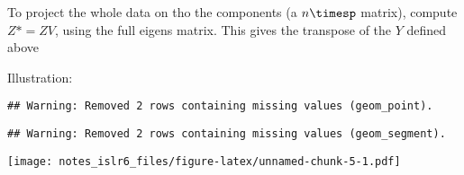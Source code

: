 \documentclass[
]{article}
\newenvironment{Shaded}{\begin{snugshade}}{\end{snugshade}}
\newcommand{\DataTypeTok}[1]{\textcolor[rgb]{0.13,0.29,0.53}{#1}}
\newcommand{\DecValTok}[1]{\textcolor[rgb]{0.00,0.00,0.81}{#1}}
\newcommand{\KeywordTok}[1]{\textcolor[rgb]{0.13,0.29,0.53}{\textbf{#1}}}
\newcommand{\NormalTok}[1]{#1}
\newcommand{\OperatorTok}[1]{\textcolor[rgb]{0.81,0.36,0.00}{\textbf{#1}}}
\newcommand{\StringTok}[1]{\textcolor[rgb]{0.31,0.60,0.02}{#1}}
\begin{document}
To project the whole data on tho the components (a \(n\timesp\) matrix),
compute \(Z*=ZV\), using the full eigens matrix. This gives the
transpose of the \(Y\) defined above

Illustration:

\begin{Shaded}
\end{Shaded}

\begin{verbatim}
## Warning: Removed 2 rows containing missing values (geom_point).
\end{verbatim}

\begin{verbatim}
## Warning: Removed 2 rows containing missing values (geom_segment).
\end{verbatim}

\texttt{[image: notes\_islr6\_files/figure-latex/unnamed-chunk-5-1.pdf]}
\end{document}
